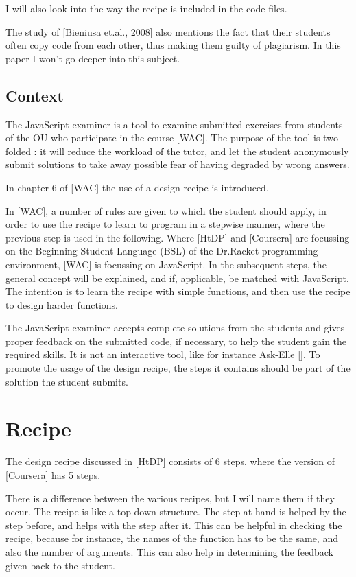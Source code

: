 \documentclass{article}
\begin{document}
I will also look into the way the recipe is included in the code files.

The study of [Bieniusa et.al., 2008] also mentions the fact that their students often copy code from
each other, thus making them guilty of plagiarism.
In this paper I won't go deeper into this subject.


\subsection{Context}

The JavaScript-examiner is a tool to examine submitted exercises from students
of the OU who participate in the course [WAC].
The purpose of the tool is two-folded : it will  reduce the workload of the
tutor, and let the student anonymously submit solutions to take away possible
fear of having degraded by wrong answers.

In chapter 6 of [WAC] the use of a design recipe is introduced.

In [WAC], a number of rules are given to which the student should apply, in
order to use the recipe to learn to program in a stepwise manner, where the
previous step is used in the following.
Where [HtDP] and [Coursera] are focussing on the Beginning Student Language
(BSL) of the Dr.Racket programming environment, [WAC] is focussing on JavaScript.
In the subsequent steps, the general concept will be explained, and if,
applicable, be matched with JavaScript.
The intention is to learn the recipe with simple functions, and then use the
recipe to design harder functions.

The JavaScript-examiner accepts complete solutions from the students and gives proper
feedback on the submitted code, if necessary, to help the student gain the
required skills. It is not an interactive tool, like for instance Ask-Elle [].
To promote the usage of the design recipe, the steps it contains should be part
of the solution the student submits.


\section{Recipe}
The design recipe discussed in [HtDP] consists of 6 steps, where the version of
[Coursera] has 5 steps.

There is a difference between the various recipes, but I will name them if they occur.
The recipe is like a top-down structure. The step at hand is helped by the step
before, and helps with the step after it.
This can be helpful in checking the recipe, because for instance, the names of
the function has to be the same, and also the number of arguments.
This can also help in determining the feedback given back to the student.
\end{document}
